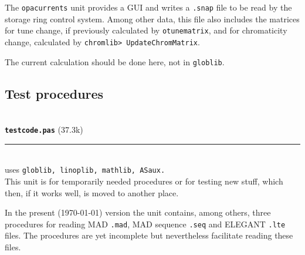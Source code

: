 \documentclass[12pt]{article}
\newcommand\code[1]{{\tt #1}}
\newcommand{\opauni}[1]{\colorbox{orange!30}{{\color{black}\code{#1}}}}
\newcommand{\ounih}[2]{\subsection{\label{#2}#1}{\Huge\opauni{#2}}\\}
\newcommand{\todo}[1]{{\color{red} #1}}
\newcommand\opamodule[3]{{\bf \tt #1} #2\\  \rule[3pt]{\textwidth}{0.2pt} \\ {\scriptsize uses \tt  #3}\\[1ex]}
\begin{document}
The {\tt opacurrents} unit provides a GUI and writes a {\tt .snap} file to be read by the storage ring control system. Among other data, this file also includes the matrices for tune change, if previously calculated by \code{otunematrix}, and for chromaticity change, calculated by \code{chromlib> UpdateChromMatrix}.

\todo{The current calculation should be done here, not in {\tt globlib}.}\\







\ounih{Test procedures}{testcode} 


\opamodule{testcode.pas}{(37.3k)}{globlib, linoplib, mathlib, ASaux.}
This unit is for temporarily needed procedures or for testing new stuff, which then, if it works well, is moved to another place.

In the present (\today) version the unit contains, among others, three procedures for reading MAD {\tt .mad}, MAD sequence {\tt .seq} and ELEGANT {\tt .lte} files. The procedures are yet incomplete but nevertheless facilitate reading these files.\\
\end{document}
